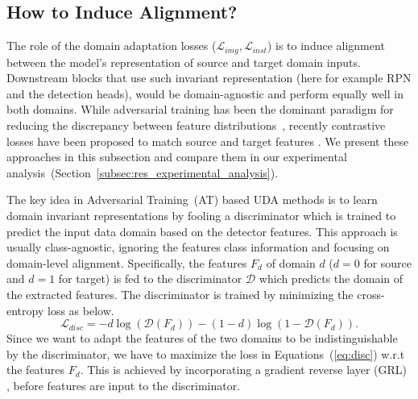 \documentclass[10pt,twocolumn,letterpaper]{article}
\DeclareRobustCommand{\secref}[1]{Section~\ref{#1}}
\DeclareRobustCommand{\eqnsref}[1]{Equations~(\ref{#1})}
\begin{document}
\subsection{How to Induce Alignment?}
\label{subsec:alignment_mechanism}
The role of the domain adaptation losses ($\mathcal{L}_{img}, \mathcal{L}_{inst}$) is to induce alignment between the model's representation of source and target domain inputs. 
Downstream blocks that use such invariant representation (here for example RPN and the detection heads), 
would be domain-agnostic and perform equally well in both domains.
While adversarial training has been the dominant paradigm for reducing the discrepancy between feature distributions~\cite{da_faster_rcnn, strong-weak, zhu_cvpr19_selective_alignment}, recently contrastive losses have been proposed to match source and target features \cite{GPA, kang2019contrastive}. We present these approaches in this subsection and compare them in our experimental analysis~(\secref{subsec:res_experimental_analysis}).

 The key idea in Adversarial Training~(AT) based UDA methods is to learn domain invariant representations by fooling a discriminator which is trained to predict the input data domain based on the detector features. 
This approach is usually class-agnostic, ignoring the features class information and focusing on domain-level alignment. 
Specifically, the features $F_d$ of domain $d$ ($d=0$ for source and $d=1$ for target) is fed to the discriminator $\mathcal{D}$ which predicts the domain of the extracted features. 
The discriminator is trained by minimizing the cross-entropy loss as below.
\begin{equation}
    \mathcal{L}_{disc} = -d\log(\mathcal{D}(F_{d})) - (1-d)\log(1- \mathcal{D}(F_{d})). 
    \label{eq:disc}
\end{equation}
Since we want to adapt the features of the two domains to be indistinguishable by the discriminator, we have to maximize the loss in \eqnsref{eq:disc} w.r.t the features $F_d$. This is achieved by incorporating a gradient reverse layer (GRL) \cite{grl_ganin}, before features are input to the discriminator.
\end{document}
